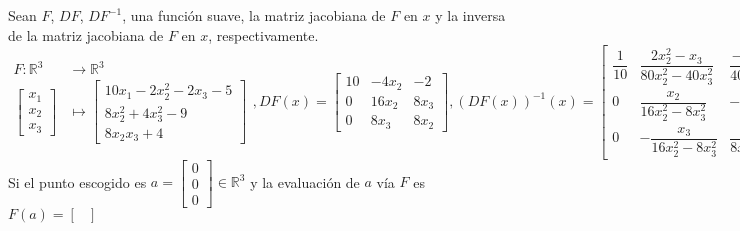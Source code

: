 \begin{frame}
	\begin{solution}
		Sean $F$, $DF$, $DF^{-1}$, una función suave, la matriz jacobiana
		de $F$ en $x$ y la inversa de la matriz jacobiana de $F$ en $x$,
		respectivamente.
		\begin{equation*}
			\begin{aligned}
				F\colon\mathbb{R}^{3} & \longrightarrow\mathbb{R}^{3} \\
				\begin{bmatrix}
					x_{1} \\
					x_{2} \\
					x_{3}
				\end{bmatrix}
				                      & \longmapsto
				\begin{bmatrix}
					10x_{1}-2x^{2}_{2}-2x_{3}-5 \\
					8x^2_{2}+4x^2_{3}-9         \\
					8x_{2}x_{3}+4
				\end{bmatrix}
			\end{aligned},
			DF\left(x\right)=
			\begin{bmatrix}
				10 & -4x_{2} & -2     \\
				0  & 16x_{2} & 8x_{3} \\
				0  & 8x_{3}  & 8x_{2}
			\end{bmatrix},
			{\left(DF\left(x\right)\right)}^{-1}\left(x\right)=
			\begin{bmatrix}
				\dfrac{1}{10} & \dfrac{2x^{2}_{2} - x_{3}}{80x^{2}_{2} - 40x^{2}_{3}} & \dfrac{-x_{2}x_{3} + x_{2}}{40x^{2}_{2} - 20x^{2}_{3}} \\
				0             & \dfrac{x_{2}}{16x^{2}_{2} - 8x^{2}_{3}}               & -\dfrac{x_{3}}{16x^{2}_{2} - 8x^{2}_{3}}               \\
				0             & -\dfrac{x_{3}}{16x^{2}_{2} - 8x^{2}_{3}}              & \dfrac{x_{2}}{8x^{2}_{2} - 4x^{2}_{3}}
			\end{bmatrix}.
		\end{equation*}
		Si el punto escogido es
		\begin{math}
			a=
			\begin{bmatrix}
				0 \\
				0 \\
				0
			\end{bmatrix}
			\in\mathbb{R}^{3}
		\end{math}
		y la evaluación de $a$ vía $F$ es
		\begin{math}
			F\left(a\right)=
			\begin{bmatrix}

\end{bmatrix}
\end{math}
\end{solution}
\end{frame}
